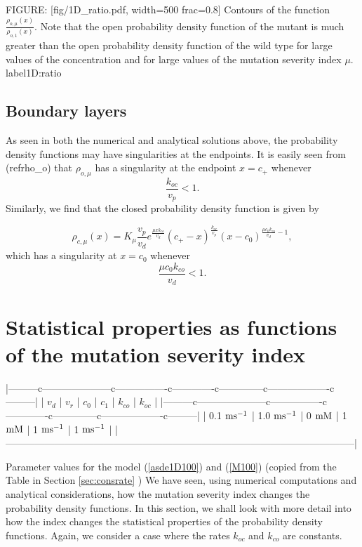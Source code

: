 FIGURE: [fig/1D_ratio.pdf, width=500 frac=0.8] Contours of the function $\frac{\rho_{o,\mu}(x)}{\rho_{o,1}(x)}$. Note that the open probability density function
of the mutant is much greater than the open probability density function
of the wild type for large values of the concentration and for large values of the mutation severity index $\mu$. label{1D:ratio}\subsection{Boundary layers}

As seen in both the numerical and analytical solutions above, the probability
density functions may have singularities at the endpoints. It is easily seen
from (ref{rho_o}) that $\rho_{o,\mu}$ has a singularity at
the endpoint $x=c_{+}$ whenever
\[
\frac{k_{oc}}{v_{p}}<1.
\]
Similarly, we find that the closed probability density function is given by



\[
\rho_{c,\mu}(x)=K_{\mu}\frac{v_{p}}{v_{d}}e^{\frac{\mu xk_{co}}{v_{d}}}
(c_{+}-x)^{\frac{k_{oc}}{v_{p}}}(x-c_{0})^{\frac{\mu c_{0}k_{co}}{v_{d}}-1},
\]
which has a singularity at $x=c_{0}$ whenever
\[
\frac{\mu c_{0}k_{co}}{v_{d}}<1.
\]


\bigskip

\section[Statistical properties of the mutation]{Statistical properties as functions of the mutation severity index}
\label{statprop}
|---------c---------------------c----------------c-------------c--------------c-------------------c---------|
| $v_d$              | $v_r$              | $c_0$       | $c_1$       | $k_{co}$         | $k_{oc}$         |
|---------c---------------------c----------------c-------------c--------------c-------------------c---------|
| 0.1 $\rm{ms^{-1}}$ | 1.0 $\rm{ms^{-1}}$ | 0 $\rm{mM}$ | 1 $\rm{mM}$ | 1 $\rm{ms^{-1}}$ | 1 $\rm{ms^{-1}}$ |
|-----------------------------------------------------------------------------------------------------------|

Parameter values for the model (\ref{asde1D100}) and (\ref{M100}) (copied from the Table in Section \ref{sec:consrate} ) %
We have seen, using numerical computations and analytical considerations, how
the mutation severity index changes the probability density functions. In this
section, we shall look with more detail into how the index changes the
statistical properties of the probability density functions. Again, we consider a case where
the rates $k_{oc}$ and  $k_{co}$ are constants.



